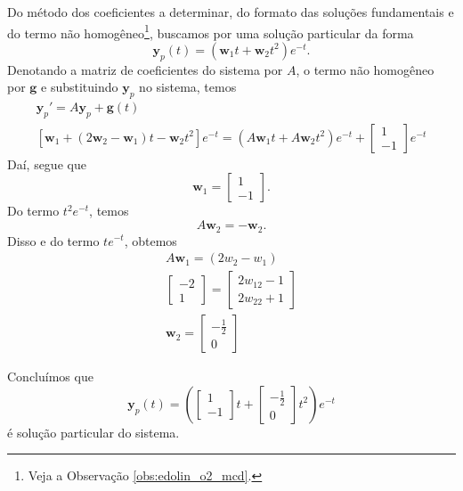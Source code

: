 \begin{resol}
  Do método dos coeficientes a determinar, do formato das soluções fundamentais e do termo não homogêneo\footnote{Veja a Observação \ref{obs:edolin_o2_mcd}.}, buscamos por uma solução particular da forma
  \begin{equation}
    \pmb{y}_p(t) = (\pmb{w}_1t + \pmb{w}_2t^2)e^{-t}.
  \end{equation}
  Denotando a matriz de coeficientes do sistema por $A$, o termo não homogêneo por $\pmb{g}$ e substituindo $\pmb{y}_p$ no sistema, temos
  \begin{gather}
    \pmb{y}_p' = A\pmb{y}_p + \pmb{g}(t) \\
    \left[\pmb{w}_1 + (2\pmb{w}_2 - \pmb{w}_1)t - \pmb{w}_2t^2\right]e^{-t} = (A\pmb{w}_1t + A\pmb{w}_2t^2)e^{-t} +
    \begin{bmatrix}
      1 \\
      -1
    \end{bmatrix}e^{-t}
  \end{gather}
  Daí, segue que
  \begin{equation}
    \pmb{w}_1 =
    \begin{bmatrix}
      1 \\
      -1
    \end{bmatrix}.
  \end{equation}
  Do termo $t^2e^{-t}$, temos
  \begin{equation}
    A\pmb{w}_2 = -\pmb{w}_2.
  \end{equation}
  Disso e do termo $te^{-t}$, obtemos
  \begin{gather}
    A\pmb{w}_1 = (2w_2 - w_1) \\
    \begin{bmatrix}
      -2 \\
      1
    \end{bmatrix} =
    \begin{bmatrix}
      2w_{12}-1 \\
      2w_{22}+1
    \end{bmatrix} \\
    \pmb{w}_2 =
    \begin{bmatrix}
      -\frac{1}{2} \\
      0
    \end{bmatrix}
  \end{gather}

  Concluímos que
  \begin{equation}
    \pmb{y}_p(t) = \left(
      \begin{bmatrix}
        1 \\
        -1
      \end{bmatrix}t +
      \begin{bmatrix}
        -\frac{1}{2} \\
        0
      \end{bmatrix}t^2\right)e^{-t}
  \end{equation}
  é solução particular do sistema.
\end{resol}

